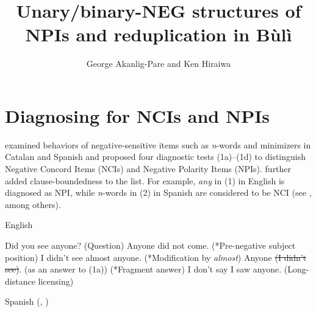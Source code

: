 \documentclass[output=paper,colorlinks,citecolor=brown]{langscibook}
\title{Unary/binary-NEG structures of NPIs and reduplication in Bùlì}
\author{George Akanlig-Pare\affiliation{University of Ghana, Legon} and Ken Hiraiwa\affiliation{Meiji Gakuin University}}
\begin{document}
\maketitle 

\section{Diagnosing for NCIs and NPIs}

\cite{Vallduvi1994} examined behaviors of negative-sensitive items such as \textit{n}-words and minimizers in Catalan and Spanish and proposed four diagnostic tests (1a)--(1d) to distinguish Negative Concord Items (NCIs) and Negative Polarity Items (NPIs). \cite{Giannakidou2000} further added clause-boundedness to the list. For example, \textit{any} in (1) in English is diagnosed as NPI, while \textit{n}-words in (2) in Spanish are considered to be NCI (see \citealt{Ladusaw1979, HaegemanZanuttini1996, Haegeman1995, Watanabe2004, Giannakidou2006, GiannakidouZeijlstra2017}, among others).

\begin{exe}
\ex English
\begin{xlist}
    \ex Did you see anyone?           \hfill{(Question)}
    \ex *Anyone did not come.               \hfill{(*Pre-negative subject position)}
    \ex *I didn't see almost anyone.           \hfill{(*Modification by \textit{almost})}
    \ex *Anyone \sout{(I didn't see)}. (as an answer to (1a))      \hfill{(*Fragment answer)}
    \ex I don't say I saw anyone.            \hfill{(Long-distance licensing)}
\end{xlist}
\end{exe}

\begin{exe}

\ex Spanish (\citealt{Vallduvi1994}, \citealt{Penka2011})
\begin{xlist}
\end{xlist}
\end{exe}
\end{document}
